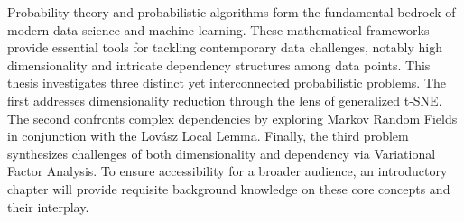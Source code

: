 \abstract
Probability theory and probabilistic algorithms form the fundamental bedrock of modern data science and machine learning. These mathematical frameworks provide essential tools for tackling contemporary data challenges, notably high dimensionality and intricate dependency structures among data points. This thesis investigates three distinct yet interconnected probabilistic problems. The first addresses dimensionality reduction through the lens of generalized t-SNE. The second confronts complex dependencies by exploring Markov Random Fields in conjunction with the Lovász Local Lemma. Finally, the third problem synthesizes challenges of both dimensionality and dependency via Variational Factor Analysis. To ensure accessibility for a broader audience, an introductory chapter will provide requisite background knowledge on these core concepts and their interplay.